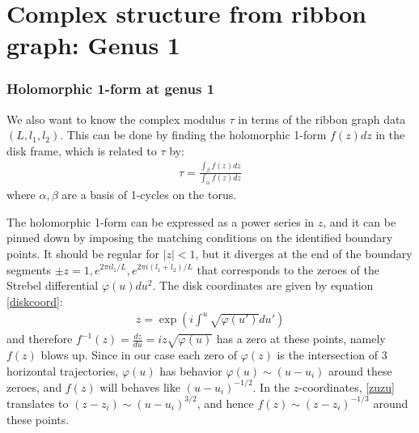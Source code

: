 \documentclass[12pt,letterpaper]{article}
\def\ie{\begin{equation}\begin{aligned}}
\def\fe{\end{aligned}\end{equation}}
\numberwithin{equation}{section}
\begin{document}
\section{Complex structure from ribbon graph: Genus 1}

\subsubsection*{Holomorphic 1-form at genus 1}

We also want to know the complex modulus $\tau$ in terms of the ribbon graph data $(L, l_1, l_2)$. This can be done by finding the holomorphic 1-form $f(z)dz$ in the disk frame, which is related to $\tau$ by:
\ie
\tau = \frac{\int_\beta f(z)dz}{\int_\alpha f(z)dz}
\fe
where $\alpha, \beta$ are a basis of 1-cycles on the torus.

The holomorphic 1-form can be expressed as a power series in $z$, and it can be pinned down by imposing the matching conditions on the identified boundary points. It should be regular for $|z|<1$, but it diverges at the end of the boundary segments $\pm z=1, e^{2\pi i l_1/L}, e^{2\pi i (l_1+l_2)/L}$ that corresponds to the zeroes of the Strebel differential $\varphi(u)du^2$. The disk coordinates are given by equation \eqref{diskcoord}:
\ie
z=\exp\left(i\int^u \sqrt{\varphi(u')}du'\right)
\label{zuzu}
\fe
and therefore $f^{-1}(z)=\frac{dz}{du}=iz \sqrt{\varphi(u)}$ has a zero at these points, namely $f(z)$ blows up. Since in our case each zero of $\varphi(z)$ is the intersection of 3 horizontal trajectories, $\varphi(u)$ has behavior $\varphi(u)\sim (u-u_i)$ around these zeroes, and $f(z)$ will behaves like $(u-u_i)^{-1/2}$. In the $z$-coordinates, \eqref{zuzu} translates to $(z-z_i)\sim (u-u_i)^{3/2}$, and hence $f(z)\sim (z-z_i)^{-1/3}$ around these points. 
\end{document}

